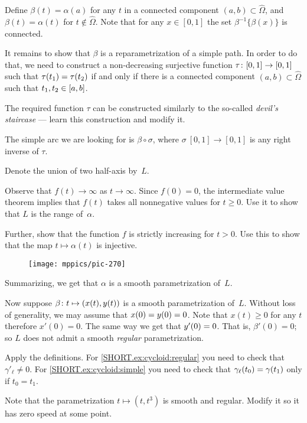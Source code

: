 \begin{multicols}{2}
Define $\beta(t)=\alpha(a)$ for any $t$ in a connected component $(a,b)\subset\hat \Omega$, and $\beta (t) = \alpha (t) $ for $t\notin\hat{\Omega}$.
Note that for any $x\in [0,1]$ the set $\beta^{-1}\{\beta(x)\}$ is connected.

It remains to show that $\beta$ is a reparametrization of a simple path.
In order to do that, we need to construct a non-decreasing surjective function $\tau\:[0,1]\z\to[0,1]$ such that 
$\tau(t_1)\z=\tau(t_2)$ if and only if there is a connected component $(a,b)\subset\hat \Omega$ such that $t_1,t_2\z\in [a,b]$.

The required function $\tau$ can be constructed similarly to the so-called {}\emph{devil's staircase} --- learn this construction and modify it.

The simple arc we are looking for is $\beta \circ \sigma$, where $\sigma\: [0,1]\to [0,1]$ is any right inverse of $\tau$.

Denote the union of two half-axis by~$L$.

Observe that $f(t)\to\infty$ as $t\to \infty$.
Since $f(0)=0$, the intermediate value theorem implies that $f(t)$ takes all nonnegative values for $t\ge 0$.
Use it to show that $L$ is the range of~$\alpha$.

Further, show that the function $f$ is strictly increasing for $t> 0$.
Use this to show that the map $t\mapsto \alpha(t)$ is injective.

\begin{wrapfigure}{r}{20 mm}
\vskip-7mm
\centering
\texttt{[image: mppics/pic-270]}
\vskip0mm
\end{wrapfigure}

Summarizing, we get that $\alpha$ is a smooth parametrization of~$L$. 

Now suppose $\beta\:t\z\mapsto (x(t),y(t))$ is a smooth parametrization of~$L$.
Without loss of generality, we may assume that $x(0)\z=y(0)=0$.
Note that $x(t)\ge 0$ for any $t$ therefore $x'(0)=0$.
The same way we get that $y'(0)\z=0$.
That is, $\beta'(0)=0$;
so $L$ does not admit a smooth \emph{regular} parametrization.

Apply the definitions.
For \ref{SHORT.ex:cycloid:regular} you need to check that $\gamma'_\ell\ne 0$.
For \ref{SHORT.ex:cycloid:simple} you need to check that $\gamma_\ell(t_0)\z=\gamma(t_1)$ only if $t_0=t_1$.

Note that the parametrization $t\mapsto (t,t^3)$ is smooth and regular.
Modify it so it has zero speed at some point.


\end{multicols}
